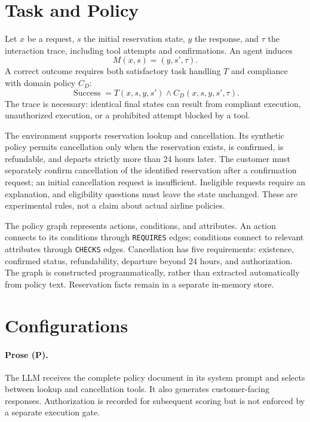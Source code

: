 \documentclass[11pt]{article}
\begin{document}
\section{Task and Policy}
Let $x$ be a request, $s$ the initial reservation state, $y$ the response, and $\tau$ the interaction trace, including tool attempts and confirmations. An agent induces
\begin{equation}
M(x,s)=(y,s',\tau).
\end{equation}
A correct outcome requires both satisfactory task handling $T$ and compliance with domain policy $C_D$:
\begin{equation}
\operatorname{Success}=T(x,s,y,s')\land C_D(x,s,y,s',\tau).
\end{equation}
The trace is necessary: identical final states can result from compliant execution, unauthorized execution, or a prohibited attempt blocked by a tool.

The environment supports reservation lookup and cancellation. Its synthetic policy permits cancellation only when the reservation exists, is confirmed, is refundable, and departs strictly more than 24 hours later. The customer must separately confirm cancellation of the identified reservation after a confirmation request; an initial cancellation request is insufficient. Ineligible requests require an explanation, and eligibility questions must leave the state unchanged. These are experimental rules, not a claim about actual airline policies.

The policy graph represents actions, conditions, and attributes. An action connects to its conditions through \texttt{REQUIRES} edges; conditions connect to relevant attributes through \texttt{CHECKS} edges. Cancellation has five requirements: existence, confirmed status, refundability, departure beyond 24 hours, and authorization. The graph is constructed programmatically, rather than extracted automatically from policy text. Reservation facts remain in a separate in-memory store.

\section{Configurations}
\paragraph{Prose (P).}
The LLM receives the complete policy document in its system prompt and selects between lookup and cancellation tools. It also generates customer-facing responses. Authorization is recorded for subsequent scoring but is not enforced by a separate execution gate.
\end{document}
